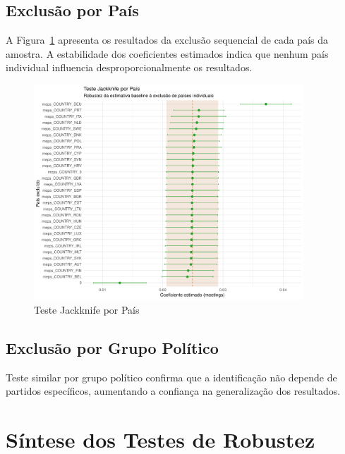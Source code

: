 \subsection{Exclusão por País}

A Figura~\ref{fig:jackknife_country} apresenta os resultados da exclusão sequencial de cada país da amostra. A estabilidade dos coeficientes estimados indica que nenhum país individual influencia desproporcionalmente os resultados.

\begin{figure}[htbp]
    \centering
    \includegraphics[width=0.9\textwidth]{figures/robustness/jackknife_country.pdf}
    \caption{Teste Jackknife por País}
    \label{fig:jackknife_country}
\end{figure}

\subsection{Exclusão por Grupo Político}

Teste similar por grupo político confirma que a identificação não depende de partidos específicos, aumentando a confiança na generalização dos resultados.

\section{Síntese dos Testes de Robustez}

